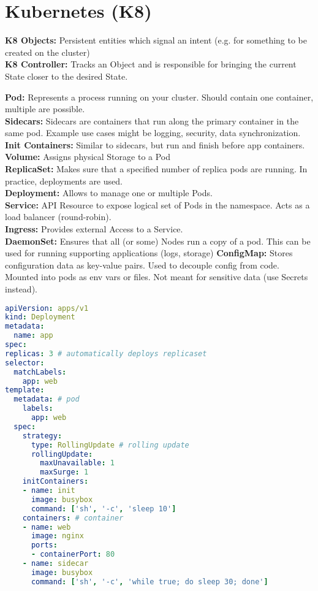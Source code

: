 \section{Kubernetes (K8)}
\begin{mdframed}
	\textbf{K8 Objects:} Persistent entities which signal an intent (e.g. for something to be created on the cluster) \\
	\textbf{K8 Controller:} Tracks an Object and is responsible for bringing the current State closer to the desired State.
\end{mdframed}

\textbf{Pod:} Represents a process running on your cluster. Should contain one container, multiple are possible. \\
\textbf{Sidecars:} Sidecars are containers that run along the primary container in the same pod. Example use cases might be logging, security, data synchronization. \\
\textbf{Init Containers:} Similar to sidecars, but run and finish before app containers.
\textbf{Volume:} Assigns physical Storage to a Pod \\
\textbf{ReplicaSet:} Makes sure that a specified number of replica pods are running. In practice, deployments are used. \\
\textbf{Deployment:} Allows to manage one or multiple Pods. \\
\textbf{Service:} API Resource to expose logical set of Pods in the namespace. Acts as a load balancer (round-robin). \\
\textbf{Ingress:} Provides external Access to a Service. \\
\textbf{DaemonSet:} Ensures that all (or some) Nodes run a copy of a pod. This can be used for running supporting applications (logs, storage)
\textbf{ConfigMap:} Stores configuration data as key-value pairs. Used to decouple config from code. Mounted into pods as env vars or files. Not meant for sensitive data (use Secrets instead).
\begin{lstlisting}[language=yaml]
apiVersion: apps/v1
kind: Deployment
metadata:
  name: app
spec:
replicas: 3 # automatically deploys replicaset
selector:
  matchLabels:
    app: web
template:
  metadata: # pod
    labels:
      app: web
  spec:
    strategy:
      type: RollingUpdate # rolling update
      rollingUpdate:
        maxUnavailable: 1
        maxSurge: 1
    initContainers:
    - name: init
      image: busybox
      command: ['sh', '-c', 'sleep 10']
    containers: # container
    - name: web
      image: nginx
      ports:
      - containerPort: 80
    - name: sidecar
      image: busybox
      command: ['sh', '-c', 'while true; do sleep 30; done']
\end{lstlisting}

